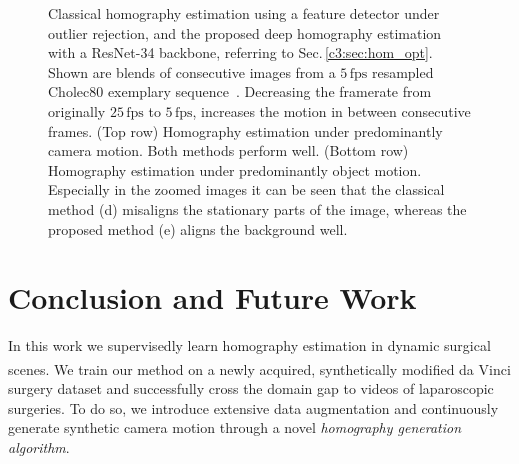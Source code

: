 \begin{figure}[tb]
    \caption{Classical homography estimation using a  feature detector under  outlier rejection, and the proposed deep homography estimation with a ResNet-34 backbone, referring to Sec.\,\ref{c3:sec:hom_opt}. Shown are blends of consecutive images from a $5\,\text{fps}$ resampled Cholec80 exemplary sequence~\cite{twinanda2016endonet}. Decreasing the framerate from originally $25\,\text{fps}$ to $5\,\text{fps}$, increases the motion in between consecutive frames. (Top row) Homography estimation under predominantly camera motion. Both methods perform well. (Bottom row) Homography estimation under predominantly object motion. Especially in the zoomed images it can be seen that the classical method (d) misaligns the stationary parts of the image, whereas the proposed method (e) aligns the background well.}
    \label{c3:fig:qualitative}
\end{figure}



\section{Conclusion and Future Work}

In this work we supervisedly learn homography estimation in dynamic surgical scenes. We train our method on a newly acquired, synthetically modified da Vinci\textsuperscript{\textregistered} surgery dataset and successfully cross the domain gap to videos of laparoscopic surgeries. To do so, we introduce extensive data augmentation and continuously generate synthetic camera motion through a novel \textit{homography generation algorithm}.

